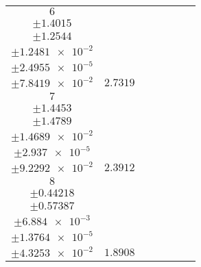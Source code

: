 \documentclass[8pt]{article}
\begin{document}
\begin{longtable}[l]{c c c c c c c}
$\num{6}$ & \begin{tabular}[c]{@{}c@{}}$\num{64.016}$ \\ $\pm\num{1.4015}$\end{tabular} & \begin{tabular}[c]{@{}c@{}}$\num{0.3593}$ \\ $\pm\num{1.2544}$\end{tabular} & \begin{tabular}[c]{@{}c@{}}$\num{1.1685e+3}$ \\ $\pm\num{1.2481e-2}$\end{tabular} & \begin{tabular}[c]{@{}c@{}}$\num{2.3364}$ \\ $\pm\num{2.4955e-5}$\end{tabular} & \begin{tabular}[c]{@{}c@{}}$\num{7.7368}$ \\ $\pm\num{7.8419e-2}$\end{tabular} & $\num{2.7319}$\\
$\num{7}$ & \begin{tabular}[c]{@{}c@{}}$\num{55.995}$ \\ $\pm\num{1.4453}$\end{tabular} & \begin{tabular}[c]{@{}c@{}}$\num{0.12828}$ \\ $\pm\num{1.4789}$\end{tabular} & \begin{tabular}[c]{@{}c@{}}$\num{1.1703e+3}$ \\ $\pm\num{1.4689e-2}$\end{tabular} & \begin{tabular}[c]{@{}c@{}}$\num{2.34}$ \\ $\pm\num{2.937e-5}$\end{tabular} & \begin{tabular}[c]{@{}c@{}}$\num{7.69}$ \\ $\pm\num{9.2292e-2}$\end{tabular} & $\num{2.3912}$\\
$\num{8}$ & \begin{tabular}[c]{@{}c@{}}$\num{44.148}$ \\ $\pm\num{0.44218}$\end{tabular} & \begin{tabular}[c]{@{}c@{}}$\num{-0.17126}$ \\ $\pm\num{0.57387}$\end{tabular} & \begin{tabular}[c]{@{}c@{}}$\num{1.1726e+3}$ \\ $\pm\num{6.884e-3}$\end{tabular} & \begin{tabular}[c]{@{}c@{}}$\num{2.3446}$ \\ $\pm\num{1.3764e-5}$\end{tabular} & \begin{tabular}[c]{@{}c@{}}$\num{7.5003}$ \\ $\pm\num{4.3253e-2}$\end{tabular} & $\num{1.8908}$\\
\bottomrule
\end{longtable}
\end{document}
